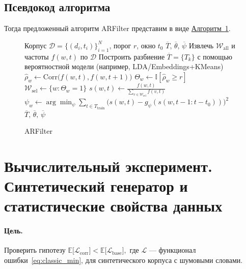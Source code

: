 \documentclass[14pt,a4paper]{article}
\begin{document}
\newpage
\subsection{Псевдокод алгоритма}
\label{ssec:pseudocode}

Тогда предложенный алгоритм ARFilter представим в виде \hyperref[alg:selection]{Алгоритм~\ref{alg:selection}}.

\begin{figure}[h]
  \centering
  \begin{minipage}{.9\linewidth}
    \begin{algorithm}[H]
      \caption{ARFilter}\label{alg:selection}
      \begin{algorithmic}[1]
        \Require Корпус \(\mathcal{D}=\{(d_i,t_i)\}_{i=1}^N\), порог \(r\), окно \(t_0\)
        \Ensure \(\overline{T},\,\overline{\theta},\,\overline{\psi}\)
        \State Извлечь \(\mathcal{W}_{\mathrm{all}}\) и частоты \(f(w,t)\) по $\mathcal{D}$
        \State Построить разбиение \(\overline{T}=\{T_k\}\) с помощью вероятностной модели (например, LDA/Embeddings+KMeans)
          \State \(\widehat\rho_w\gets\mathrm{Corr}\bigl(f(w,t),f(w,t+1)\bigr)\)
          \State \(\Theta_w\gets\mathbb I[\widehat\rho_w\ge r]\)
        \EndFor
        \State \(\mathcal{W}_{\mathrm{sel}}\gets\{w:\Theta_w=1\}\)
          \State \(s(w,t)\gets \frac{f(w,t)}{\sum_{v\in\mathcal{W}_{\mathrm{sel}}}f(v,t)}\)
          \State \(\psi_w\gets\arg\min_{\psi}\sum_{t\in T_{\mathrm{train}}}\bigl(s(w,t)-g_{\psi}(s(w,t-1:t-t_0))\bigr)^2\)
        \EndFor
        \State \Return \(\overline{T},\,\overline{\theta},\,\overline{\psi}\)
      \end{algorithmic}
    \end{algorithm}
  \end{minipage}
\end{figure}


\newpage
\section{Вычислительный эксперимент. Синтетический генератор и статистические свойства данных}

\paragraph{Цель.}
Проверить гипотезу
\(
  \mathbb{E}\!\bigl[\mathcal L_{\mathrm{corr}}\bigr]
  <
  \mathbb{E}\!\bigl[\mathcal L_{\mathrm{base}}\bigr],
\)
где $\mathcal L$ — функционал ошибки~\eqref{eq:classic_min},
для синтетического корпуса с шумовыми словами.
\end{document}
